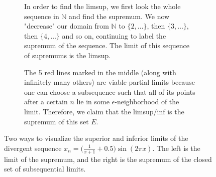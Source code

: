 \begin{definition}
\begin{figure}[H]
\begin{subfigure}[b]{0.48\textwidth}
        \caption{In order to find the limsup, we first look the whole sequence in $\mathbb{N}$ and find the supremum. We now "decrease" our domain from $\mathbb{N}$ to $\{2, \ldots\}$, then $\{3, \ldots\}$, then $\{4, \ldots\}$ and so on, continuing to label the supremum of the sequence. The limit of this sequence of supremums is the limsup.}
        \label{fig:limsupinf1}
      \end{subfigure}
      \hfill 
      \begin{subfigure}[b]{0.48\textwidth}
        \centering
        \caption{The 5 red lines marked in the middle (along with infinitely many others) are viable partial limits because one can choose a subsequence such that all of its points after a certain $n$ lie in some $\epsilon$-neighborhood of the limit. Therefore, we claim that the limsup/inf is the supremum of this set $E$.}
        \label{fig:limsupinf2}
      \end{subfigure}
      \caption{Two ways to visualize the superior and inferior limits of the divergent sequence $x_n = \big(\frac{1}{x+1} + 0.5\big) \sin(2\pi x)$. The left is the limit of the supremum, and the right is the supremum of the closed set of subsequential limits.} 
      \label{fig:limsupinf}
    \end{figure}
  \end{definition}

